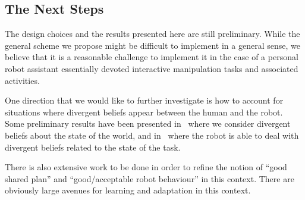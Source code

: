 \documentclass[preprint,3p,times]{elsarticle}
\begin{document}
\subsection{The Next Steps}


The design choices and the results presented here are still preliminary.
While the general scheme we propose might be difficult to implement in
a general sense, we believe that it is a reasonable challenge to
implement it in the case of a personal robot assistant essentially
devoted interactive manipulation
tasks and associated activities.

One direction that we would like to further investigate is how to account for
situations where divergent beliefs appear between the human and the robot.
Some preliminary results have been presented 
in~\cite{warnier2012when,milliez2014framework}  where we consider
divergent beliefs about the state of the world, and
in~\cite{devin2016implemented} where the robot is able to deal with
divergent beliefs related to the state of the task.

There is also extensive work to be done in order to refine the notion of ``good
shared plan'' and ``good/acceptable robot behaviour'' in this context. There are
obviously large avenues for learning and adaptation in this context.
\end{document}
